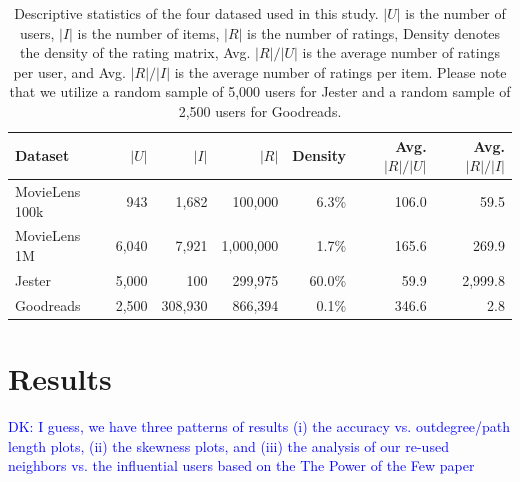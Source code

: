 \documentclass[manuscript,review,anonymous]{acmart}
\newcommand{\dk}[1]{
        \textcolor{blue}{DK: #1}}
\begin{document}
\begin{table}[!htb]
    \centering
    \begin{tabular}{l r r r r r r}
        \toprule
        Dataset & $|U|$ & $|I|$ & $|R|$ & Density & Avg. $|R| / |U|$ &  Avg. $|R| / |I|$ \\ \midrule
        MovieLens 100k & 943 & 1,682 & 100,000 & 6.3\% & 106.0 & 59.5 \\
        MovieLens 1M & 6,040 & 7,921 & 1,000,000 & 1.7\% & 165.6 & 269.9 \\
        Jester & 5,000 & 100 & 299,975 & 60.0\% & 59.9 & 2,999.8 \\
        Goodreads & 2,500 & 308,930 & 866,394 & 0.1\% & 346.6 & 2.8 \\ \bottomrule
    \end{tabular}
    \caption{Descriptive statistics of the four datased used in this study. $|U|$ is the number of users, $|I|$ is the number of items, $|R|$ is the number of ratings, Density denotes the density of the rating matrix, Avg. $|R| / |U|$ is the average number of ratings per user, and Avg. $|R| / |I|$ is the average number of ratings per item. Please note that we utilize a random sample of 5,000 users for Jester and a random sample of 2,500 users for Goodreads.}
\end{table}



\section{Results}
\dk{I guess, we have three patterns of results (i) the accuracy vs. outdegree/path length plots, (ii) the skewness plots, and (iii) the analysis of our re-used neighbors vs. the influential users based on the The Power of the Few paper}
\end{document}
